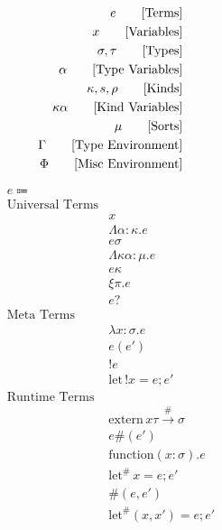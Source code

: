 \documentclass {article}
\begin{document}
\Large

\begin{align*}
e \tag* {[Terms]} \\
x \tag* {[Variables]} \\
\sigma, \tau \tag* {[Types]} \\
\alpha \tag* {[Type Variables]} \\
\kappa, s, \rho \tag* {[Kinds]} \\
\kappa \alpha \tag*{[Kind Variables]} \\
\mu \tag*{[Sorts]} \\
\Gamma \tag* {[Type Environment]} \\
\Phi \tag* {[Misc Environment]}
\end{align*}

\begin{align*}
e \Coloneqq & \\
\text{Universal Terms} \\
& x \tag*{[Variable]}\\
& \Lambda \alpha : \kappa. e \tag*{[Type Lambda]} \\
& e \sigma \tag*{[Type Application]} \\
& \Lambda \kappa \alpha : \mu. e \tag*{[Kind Lambda]} \\
& e \kappa \tag*{[Kind Application]} \\
& \xi \pi. e \tag*{[Qualified Assumption]} \\
& e? \tag*{[Qualified Check]} \\
\text{Meta Terms} \\
& \lambda x : \sigma. e \tag*{[Macro Lambda]}\\
& e(e') \tag*{[Macro Application]}\\
& !e \tag*{[Bang Introduction]} \\
& \text{let} \, !x = e; e' \tag*{[Bang Elimination]} \\ 
\text{Runtime Terms} \\
& \text{extern} \, x \tau \xrightarrow{\#} \sigma \tag*{[Extern Symbol]} \\
& e\#(e') \tag*{[Function Pointer Application]} \\
& \text{function} (x : \sigma). e \tag*{[Function Literal]} \\
& \text{let}^\# \, x = e; e' \tag*{[Runtime Let]} \\
& \#(e, e') \tag*{[Runtime Pair Introduction]} \\
& \text{let}^\# (x, x') = e; e' \tag*{[Runtime Pair Elimination]} \\

\end{align*}
\end{document}
